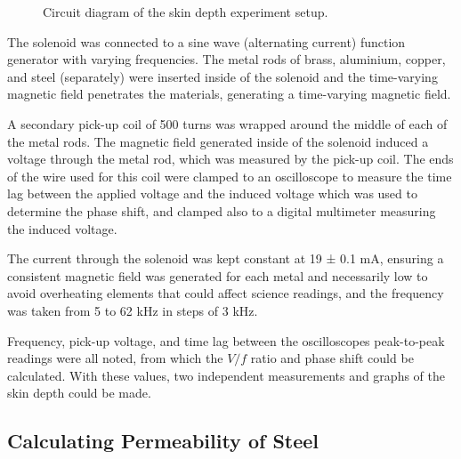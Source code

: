 \documentclass[11pt, a4paper, twocolumn]{article}
\begin{document}
\begin{figure}[ht]
  \centering
\caption{Circuit diagram of the skin depth experiment setup.}
\label{fig:2}
\end{figure}

The solenoid was connected to a sine wave (alternating current) function generator with varying frequencies. The metal rods of brass, aluminium, copper, and steel (separately) were inserted inside of the solenoid and the time-varying magnetic field penetrates the materials, generating a time-varying magnetic field.

A secondary pick-up coil of 500 turns was wrapped around the middle of each of the metal rods. The magnetic field generated inside of the solenoid induced a voltage through the metal rod, which was measured by the pick-up coil. The ends of the wire used for this coil were clamped to an oscilloscope to measure the time lag between the applied voltage and the induced voltage which was used to determine the phase shift, and clamped also to a digital multimeter measuring the induced voltage.

The current through the solenoid was kept constant at 19 ± 0.1 mA, ensuring a consistent magnetic field was generated for each metal and necessarily low to avoid overheating elements that could affect science readings, and the frequency was taken from 5 to 62 kHz in steps of 3 kHz.

Frequency, pick-up voltage, and time lag between the oscilloscopes peak-to-peak readings were all noted, from which the $V/f$ ratio and phase shift could be calculated. With these values, two independent measurements and graphs of the skin depth could be made.

\subsection{Calculating Permeability of Steel}
\end{document}
